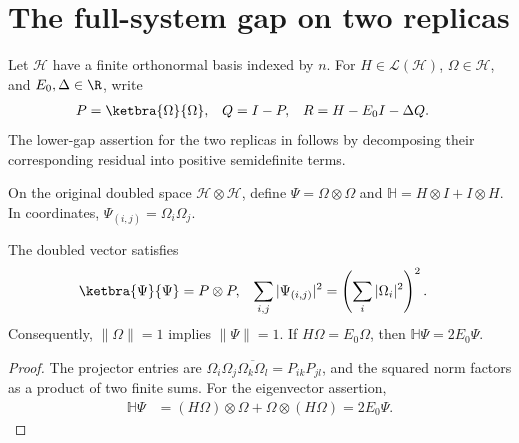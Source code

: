 \section{The full-system gap on two replicas}
\label{sec:doubled_system_gap}

Let $\mathcal H$ have a finite orthonormal basis indexed by $n$.
For $H\in\mathcal L(\mathcal H)$, $\Omega\in\mathcal H$, and
$E_0,\Delta\in\R$, write
\begin{align}
    P&=\ketbra{\Omega}{\Omega}, & Q&=I-P, &
    R&=H-E_0I-\Delta Q.
    \label{eq:doubled_gap_residual}
\end{align}
The lower-gap assertion for the two replicas in
\cite{OpenAI2026PolynomialPEPS} follows by decomposing their corresponding
residual into positive semidefinite terms.

\begin{definition}
    \label{def:doubled_system}
    \leanok
    On the original doubled space $\mathcal H\otimes\mathcal H$, define
    $\Psi=\Omega\otimes\Omega$ and
    $\mathbb H=H\otimes I+I\otimes H$. In coordinates,
    $\Psi_{(i,j)}=\Omega_i\Omega_j$.
\end{definition}

\begin{theorem}
    \label{thm:doubled_vector_properties}
    \leanok
    The doubled vector satisfies
    \begin{align}
        \ketbra{\Psi}{\Psi}&=P\otimes P, &
        \sum_{i,j}|\Psi_{(i,j)}|^2
            &=\left(\sum_i|\Omega_i|^2\right)^2.
        \label{eq:doubled_vector_product}
    \end{align}
    Consequently, $\|\Omega\|=1$ implies $\|\Psi\|=1$.
    If $H\Omega=E_0\Omega$, then $\mathbb H\Psi=2E_0\Psi$.
\end{theorem}
\begin{proof}\leanok
    The projector entries are
    $\Omega_i\Omega_j\overline{\Omega_k\Omega_l}
    =P_{ik}P_{jl}$, and the squared norm factors as a product of two
    finite sums. For the eigenvector assertion,
    \begin{align}
        \mathbb H\Psi
            &=(H\Omega)\otimes\Omega+\Omega\otimes(H\Omega)
              =2E_0\Psi.
    \end{align}
\end{proof}

